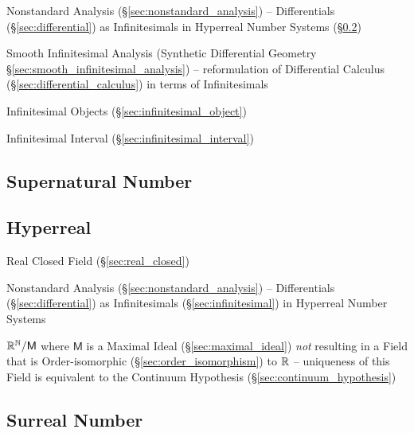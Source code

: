 \fist Nonstandard Analysis (\S\ref{sec:nonstandard_analysis}) -- Differentials
(\S\ref{sec:differential}) as Infinitesimals in
Hyperreal Number Systems (\S\ref{sec:hyperreal})

\fist Smooth Infinitesimal Analysis (Synthetic Differential Geometry
\S\ref{sec:smooth_infinitesimal_analysis}) -- reformulation of Differential
Calculus (\S\ref{sec:differential_calculus}) in terms of Infinitesimals

\fist Infinitesimal Objects (\S\ref{sec:infinitesimal_object})

\fist Infinitesimal Interval (\S\ref{sec:infinitesimal_interval})



\subsection{Supernatural Number}\label{sec:supernatural_number}

\subsection{Hyperreal}\label{sec:hyperreal}

Real Closed Field (\S\ref{sec:real_closed})

\fist Nonstandard Analysis (\S\ref{sec:nonstandard_analysis}) -- Differentials
  (\S\ref{sec:differential}) as Infinitesimals (\S\ref{sec:infinitesimal}) in
  Hyperreal Number Systems

$\mathbb{R}^{\mathbb{N}} / \mathsf{M}$ where $\mathsf{M}$ is a Maximal Ideal
(\S\ref{sec:maximal_ideal}) \emph{not} resulting in a Field that is
Order-isomorphic (\S\ref{sec:order_isomorphism}) to $\mathbb{R}$ --
uniqueness of this Field is equivalent to the Continuum Hypothesis
(\S\ref{sec:continuum_hypothesis})



\subsection{Surreal Number}\label{sec:surreal_number}

